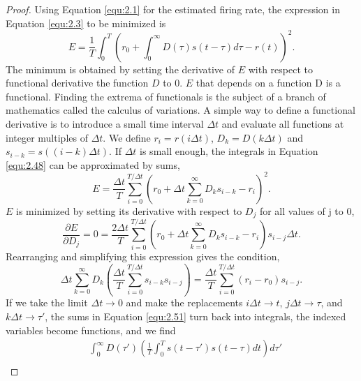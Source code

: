 \begin{proof}
  Using Equation \ref{equ:2.1} for the estimated firing rate, the expression in Equation \ref{equ:2.3} to be minimized is
  \begin{equation}
    \label{equ:2.48}
    E = \frac{1}{T}\int_0^T\left(r_0 + \int_0^{\infty}D(\tau) s(t-\tau)d\tau - r(t)\right)^2.
  \end{equation}
  The minimum is obtained by setting the derivative of $E$ with respect to functional derivative the function $D$ to $0$. $E$ that depends on a function D is a functional. Finding the extrema of functionals is the subject of a branch of mathematics called the calculus of variations. A simple way to define a functional derivative is to introduce a small time interval $\Delta t$ and evaluate all functions at integer multiples of $\Delta t$. We define $r_i = r(i\Delta t)$, $D_k = D(k\Delta t)$ and $s_{i-k} = s((i-k)\Delta t)$. If $\Delta t$ is small enough, the integrals in Equation \ref{equ:2.48} can be approximated by sums,
  \begin{equation}
    \label{equ:2.49}
    E = \frac{\Delta t}{T}\sum\limits_{i = 0}^{T/\Delta t}\left(r_0+\Delta t \sum\limits_{k = 0}^{\infty}D_ks_{i-k} - r_i\right)^2.
  \end{equation}
  $E$ is minimized by setting its derivative with respect to $D_j$ for all values of j to 0,
  \begin{equation}
    \label{equ:2.50}
    \frac{\partial E}{\partial D_j} = 0 = \frac{2\Delta t}{T}\sum\limits_{i=0}^{T/\Delta t}\left(r_0+\Delta t \sum\limits_{k = 0}^{\infty}D_ks_{i-k} - r_i\right)s_{i-j}\Delta t.
  \end{equation}
  Rearranging and simplifying this expression gives the condition,
  \begin{equation}
    \label{equ:2.51}
    \Delta t \sum\limits_{k = 0}^{\infty}D_k\left(\frac{\Delta t}{T}\sum\limits_{i=0}^{T/\Delta t}s_{i-k}s_{i-j}\right) =
    \frac{\Delta t}{T}\sum\limits_{i=0}^{T/\Delta t}(r_i-r_0)s_{i-j}.
  \end{equation}
  If we take the limit $\Delta t \to 0$ and make the replacements $i\Delta t \to t$, $j\Delta t \to \tau$, and $k\Delta t \to \tau'$, the sums in Equation \ref{equ:2.51} turn back into integrals, the indexed variables become functions, and we find
  \begin{equation}
    \label{equ:2.52}
    \begin{aligned}
      &\int_0^{\infty}D(\tau')\left(\frac{1}{T}\int_0^{T}s(t-\tau')s(t-\tau)dt\right)d\tau'\\

\end{aligned}
\end{equation}
\end{proof}
